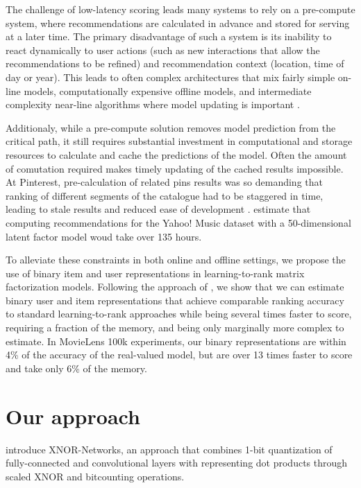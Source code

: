 \documentclass[sigchi]{acmart}
\begin{document}
The challenge of low-latency scoring leads many systems to rely on a pre-compute system, where recommendations are calculated in advance and stored for serving at a later time. The primary disadvantage of such a system is its inability to react dynamically to user actions (such as new interactions that allow the recommendations to be refined) and recommendation context (location, time of day or year). This leads to often complex architectures that mix fairly simple on-line models, computationally expensive offline models, and intermediate complexity near-line algorithms where model updating is important \citep{amatriain2013big}.

Additionaly, while a pre-compute solution removes model prediction from the critical path, it still requires substantial investment in computational and storage resources to calculate and cache the predictions of the model. Often the amount of comutation required makes timely updating of the cached results impossible. At Pinterest, pre-calculation of related pins results was so demanding that ranking of different segments of the catalogue had to be staggered in time, leading to stale results and reduced ease of development \citep[Section 5.5]{liu2017related}. \citet{koenigstein2012efficient} estimate that computing recommendations for the Yahoo! Music dataset \citep{dror2011yahoo} with a 50-dimensional latent factor model woud take over 135 hours.

To alleviate these constraints in both online and offline settings, we propose the use of binary item and user representations in learning-to-rank matrix factorization models. Following the approach of \citet{rastegari2016xnor}, we show that we can estimate binary user and item representations that achieve comparable ranking accuracy to standard learning-to-rank approaches while being several times faster to score, requiring a fraction of the memory, and being only marginally more complex to estimate. In MovieLens 100k experiments, our binary representations are within 4\% of the accuracy of the real-valued model, but are over 13 times faster to score and take only 6\% of the memory.

\section{Our approach}
\label{sec:approach}
\citet{rastegari2016xnor} introduce XNOR-Networks, an approach that combines 1-bit quantization of fully-connected and convolutional layers with representing dot products through scaled XNOR and bitcounting operations.
\end{document}
